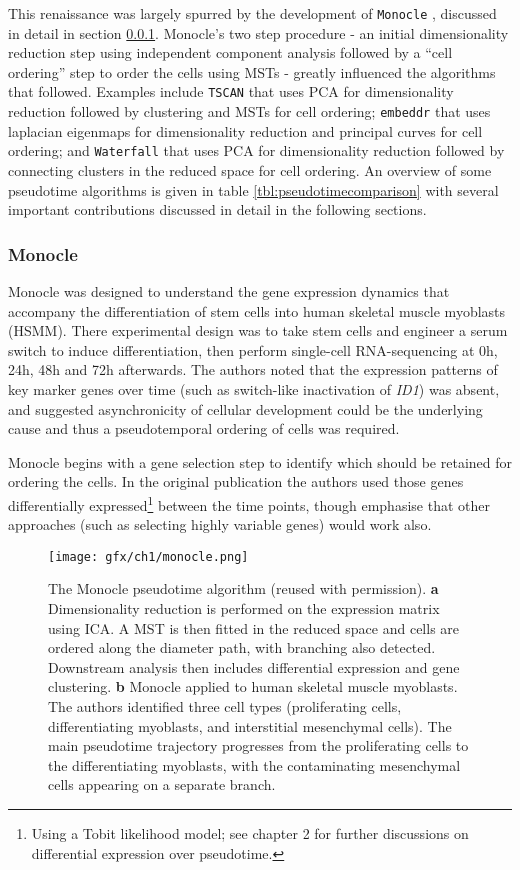 This renaissance was largely spurred by the development of \texttt{Monocle} \cite{Trapnell2014-xi}, discussed in detail in section \ref{tbl:monocle}. Monocle's two step procedure - an initial dimensionality reduction step using independent component analysis followed by a ``cell ordering'' step to order the cells using MSTs - greatly influenced the algorithms that followed. Examples include \texttt{TSCAN} that uses PCA for dimensionality reduction followed by clustering and MSTs for cell ordering; \texttt{embeddr} that uses laplacian eigenmaps for dimensionality reduction and principal curves for cell ordering; and \texttt{Waterfall} that uses PCA for dimensionality reduction followed by connecting clusters in the reduced space for cell ordering. An overview of some pseudotime algorithms is given in table \ref{tbl:pseudotimecomparison} with several important contributions discussed in detail in the following sections.

\subsubsection{Monocle} \label{tbl:monocle}

Monocle was designed to understand the gene expression dynamics that accompany the differentiation of stem cells into human skeletal muscle myoblasts (HSMM). There experimental design was to take stem cells and engineer a serum switch to induce differentiation, then perform single-cell RNA-sequencing at 0h, 24h, 48h and 72h afterwards. The authors noted that the expression patterns of key marker genes over time (such as switch-like inactivation of \emph{ID1}) was absent, and suggested asynchronicity of cellular development could be the underlying cause and thus a pseudotemporal ordering of cells was required.

Monocle begins with a gene selection step to identify which should be retained for ordering the cells. In the original publication the authors used those genes differentially expressed\footnote{
Using a Tobit likelihood model; see chapter 2 for further discussions on differential expression over pseudotime.
} between the time points, though emphasise that other approaches (such as selecting highly variable genes) would work also.

\begin{figure}
\centering
  \texttt{[image: gfx/ch1/monocle.png]}
  \caption{The Monocle pseudotime algorithm (reused with permission).
\textbf{a} Dimensionality reduction is performed on the expression matrix using ICA. A MST is then fitted in the reduced space and cells are ordered along the diameter path, with branching also detected. Downstream analysis then includes differential expression and gene clustering.
\textbf{b} Monocle applied to human skeletal muscle myoblasts. The authors identified three cell types (proliferating cells, differentiating myoblasts, and interstitial mesenchymal cells). The main pseudotime trajectory progresses from the proliferating cells to the differentiating myoblasts, with the contaminating mesenchymal cells appearing on a separate branch.
  } \label{fig:monocle}
\end{figure}

